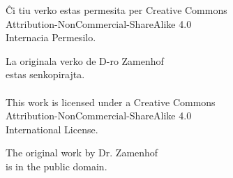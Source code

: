 \documentclass[ngerman,12pt,twoside]{book}
\begin{document}
\newpage
\thispagestyle{empty}
\vspace*{\fill}
\begin{center}
Ĉi tiu verko estas permesita per Creative Commons \\
Attribution-NonCommercial-ShareAlike 4.0 \\
Internacia Permesilo.

La originala verko de D-ro Zamenhof \\
estas senkopirajta.\\[1ex]

\ccbyncsa\\[1ex]

This work is licensed under a Creative Commons \\
Attribution-NonCommercial-ShareAlike 4.0 \\
International License.

The original work by Dr. Zamenhof \\
is in the public domain.
\vspace*{\fill}
\end{center}
\end{document}
